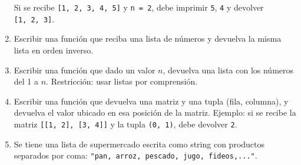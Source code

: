 \documentclass[
  letterpaper,
  DIV=11,
  numbers=noendperiod]{scrreprt}
\begin{document}
\begin{enumerate}
  Si se recibe \texttt{{[}1,\ 2,\ 3,\ 4,\ 5{]}} y \texttt{n\ =\ 2}, debe
  imprimir \texttt{5}, \texttt{4} y devolver \texttt{{[}1,\ 2,\ 3{]}}.
\item
  Escribir una función que reciba una lista de números y devuelva la
  misma lista en orden inverso.
\item
  Escribir una función que dado un valor \(n\), devuelva una lista con
  los números del 1 a \(n\). Restricción: usar listas por comprensión.
\item
  Escribir una función que devuelva una matriz y una tupla (fila,
  columna), y devuelva el valor ubicado en esa posición de la matriz.
  Ejemplo: si se recibe la matriz
  \texttt{{[}{[}1,\ 2{]},\ {[}3,\ 4{]}{]}} y la tupla \texttt{(0,\ 1)},
  debe devolver \texttt{2}.
\item
  Se tiene una lista de supermercado escrita como string con productos
  separados por coma:
  \texttt{"pan,\ arroz,\ pescado,\ jugo,\ fideos,..."}.


\end{enumerate}
\end{document}
